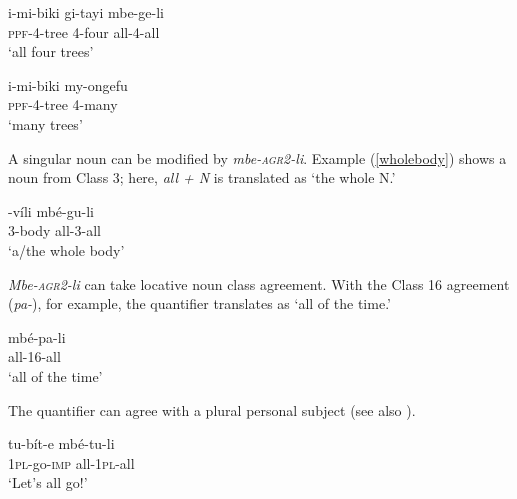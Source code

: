 \documentclass[letterpaper, 12pt]{article}
\begin{document}
\begin{exe}

\ex\begin{xlist}

\ex \gll i-mi-biki gi-tayi mbe-ge-li\\ 
\textsc{ppf}-4-tree 4-four all-4-all\\
`all four trees' \\ \label{ex:kaspercushman:alltrees}

\ex \gll i-mi-biki my-ongefu\\
\textsc{ppf}-4-tree 4-many \\
`many trees' \label{ex:kaspercushman:ex:kaspercushman:manytrees}

\end{xlist}

\end{exe}



A singular noun can be modified by \textit{mbe-\textsc{agr2}-li}. Example (\ref{wholebody}) shows a noun from Class 3; here, \textit{all + N} is translated as `the whole N.'

\begin{exe} 

\ex \gll {}-v\'ili mb\'e-gu-li  \label{wholebody} \\   
3-body all-3-all \\
`a/the whole body' \\  

\end{exe}


\textit{Mbe-\textsc{agr2}-li} can take locative noun class agreement. With the Class 16 agreement (\textit{pa-}), for example, the quantifier translates as `all of the time.'

\begin{exe}
\ex \gll mb\'e-pa-li \\
all-16-all \\
`all of the time' \\
\end{exe}


The quantifier can agree with a plural personal subject (see also \citealt{jerro13}).

\begin{exe}   

\ex \gll tu-b\'it-e mb\'e-tu-li \label{subjectagreement} \\
\textsc{1pl}-go-\textsc{imp} all-\textsc{1pl}-all \\  
`Let's all go!'

\end{exe}
\end{document}
